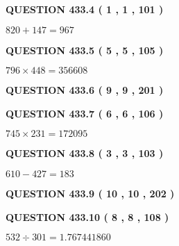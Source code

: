 \documentclass{ctexart}
\begin{document}
{\textbf{\Large{QUESTION
433.4 
 ( 1 , 1 , 101 )
}}}
  
  
 
 

$ %
820 +  %
147=   %
967$
 
 
  
\vspace{0.2in}
  
{\textbf{\Large{QUESTION
433.5 
 ( 5 , 5 , 105 )
}}}
  
  
 
 

$ %
796 \times  %
448=   %
356608$
 
 
  
\vspace{0.2in}
  
{\textbf{\Large{QUESTION
433.6 
 ( 9 , 9 , 201 )
}}}
  
  
  
\vspace{0.2in}
  
{\textbf{\Large{QUESTION
433.7 
 ( 6 , 6 , 106 )
}}}
  
  
 
 

$ %
745 \times  %
231=   %
172095$
 
 
  
\vspace{0.2in}
  
{\textbf{\Large{QUESTION
433.8 
 ( 3 , 3 , 103 )
}}}
  
  
 
 

$ %
610 -  %
427=   %
183$
 
 
  
\vspace{0.2in}
  
{\textbf{\Large{QUESTION
433.9 
 ( 10 , 10 , 202 )
}}}
  
  
  
\vspace{0.2in}
  
{\textbf{\Large{QUESTION
433.10 
 ( 8 , 8 , 108 )
}}}
  
  
 
 

$ %
532 \div  %
301=   %
1.767441860$
 
 
   
   
 \vspace{0.2in}
 
   
   
   
   
\end{document}
